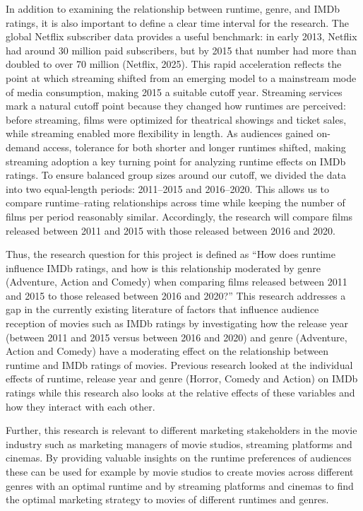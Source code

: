 \documentclass[
]{article}
\begin{document}
In addition to examining the relationship between runtime, genre, and
IMDb ratings, it is also important to define a clear time interval for
the research. The global Netflix subscriber data provides a useful
benchmark: in early 2013, Netflix had around 30 million paid
subscribers, but by 2015 that number had more than doubled to over 70
million (Netflix, 2025). This rapid acceleration reflects the point at
which streaming shifted from an emerging model to a mainstream mode of
media consumption, making 2015 a suitable cutoff year. Streaming
services mark a natural cutoff point because they changed how runtimes
are perceived: before streaming, films were optimized for theatrical
showings and ticket sales, while streaming enabled more flexibility in
length. As audiences gained on-demand access, tolerance for both shorter
and longer runtimes shifted, making streaming adoption a key turning
point for analyzing runtime effects on IMDb ratings. To ensure balanced
group sizes around our cutoff, we divided the data into two equal-length
periods: 2011--2015 and 2016--2020. This allows us to compare
runtime--rating relationships across time while keeping the number of
films per period reasonably similar. Accordingly, the research will
compare films released between 2011 and 2015 with those released between
2016 and 2020.

Thus, the research question for this project is defined as ``How does
runtime influence IMDb ratings, and how is this relationship moderated
by genre (Adventure, Action and Comedy) when comparing films released
between 2011 and 2015 to those released between 2016 and 2020?'' This
research addresses a gap in the currently existing literature of factors
that influence audience reception of movies such as IMDb ratings by
investigating how the release year (between 2011 and 2015 versus between
2016 and 2020) and genre (Adventure, Action and Comedy) have a
moderating effect on the relationship between runtime and IMDb ratings
of movies. Previous research looked at the individual effects of
runtime, release year and genre (Horror, Comedy and Action) on IMDb
ratings while this research also looks at the relative effects of these
variables and how they interact with each other.

Further, this research is relevant to different marketing stakeholders
in the movie industry such as marketing managers of movie studios,
streaming platforms and cinemas. By providing valuable insights on the
runtime preferences of audiences these can be used for example by movie
studios to create movies across different genres with an optimal runtime
and by streaming platforms and cinemas to find the optimal marketing
strategy to movies of different runtimes and genres.
\end{document}
